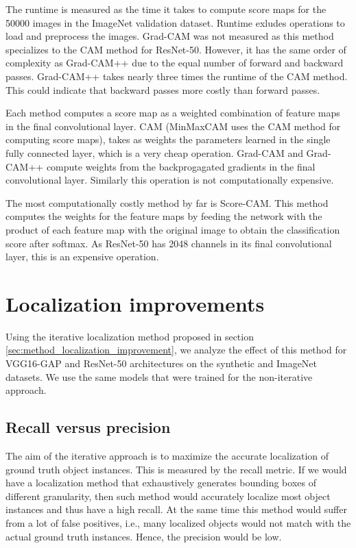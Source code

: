 The runtime is measured as the time it takes to compute score maps for the 50000 images in the ImageNet validation dataset. Runtime exludes operations to load and preprocess the images. Grad-CAM was not measured as this method specializes to the CAM method for ResNet-50. However, it has the same order of complexity as Grad-CAM++ due to the equal number of forward and backward passes. Grad-CAM++ takes nearly three times the runtime of the CAM method. This could indicate that backward passes more costly than forward passes.

Each method computes a score map as a weighted combination of feature maps in the final convolutional layer. CAM (MinMaxCAM uses the CAM method for computing score maps), takes as weights the parameters learned in the single fully connected layer, which is a very cheap operation. Grad-CAM and Grad-CAM++ compute weights from the backprogagated gradients in the final convolutional layer. Similarly this operation is not computationally expensive.

The most computationally costly method by far is Score-CAM. This method computes the weights for the feature maps by feeding the network with the product of each feature map with the original image to obtain the classification score after softmax. As ResNet-50 has 2048 channels in its final convolutional layer, this is an expensive operation.

\section{Localization improvements}

Using the iterative localization method proposed in section \ref{sec:method_localization_improvement}, we analyze the effect of this method for VGG16-GAP and ResNet-50 architectures on the synthetic and ImageNet datasets. We use the same models that were trained for the non-iterative approach.

\subsection{Recall versus precision}
The aim of the iterative approach is to maximize the accurate localization of ground truth object instances. This is measured by the recall metric. If we would have a localization method that exhaustively generates bounding boxes of different granularity, then such method would accurately localize most object instances and thus have a high recall. At the same time this method would suffer from a lot of false positives, i.e., many localized objects would not match with the actual ground truth instances. Hence, the precision would be low.

